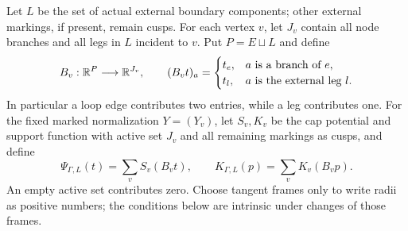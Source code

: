 Let $L$ be the set of actual external boundary components; other
external markings, if present, remain cusps. For each vertex $v$,
let $J_v$ contain all node branches and all legs in $L$ incident to
$v$. Put $P=E\sqcup L$ and define
\[
 B_v:{\mathbb{R}}^P\longrightarrow{\ensuremath{\mathbb{R}}}^{J_v},\qquad
 (B_vt)_a=
 \begin{cases}
 t_e,&a\text{ is a branch of }e,\\
 t_l,&a\text{ is the external leg }l.
 \end{cases}
\]
In particular a loop edge contributes two entries, while a leg
contributes one. For the fixed marked normalization $Y=(Y_v)$,
let $S_v,K_v$ be the cap potential and support function with active
set $J_v$ and all remaining markings as cusps, and define
\[
 \Psi_{\Gamma,L}(t)=\sum_v S_v(B_vt),\qquad
 K_{\Gamma,L}(p)=\sum_v K_v(B_vp).
\]
An empty active set contributes zero. Choose tangent frames only
to write radii as positive numbers; the conditions below are
intrinsic under changes of those frames.

